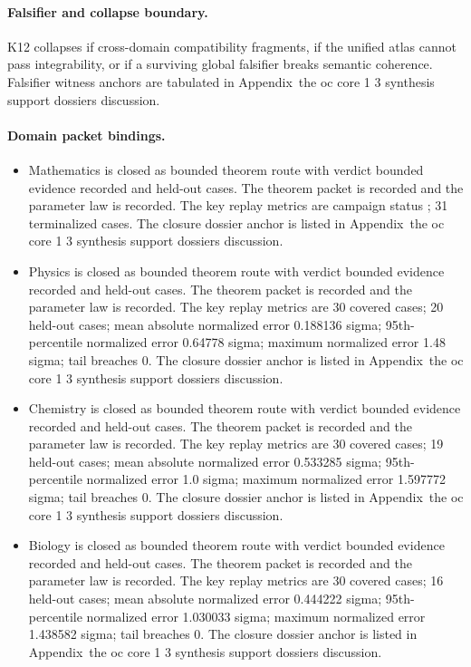 \paragraph{Falsifier and collapse boundary.}
K12 collapses if cross-domain compatibility fragments, if the unified atlas cannot pass integrability, or if a surviving global falsifier breaks semantic coherence.
Falsifier witness anchors are tabulated in Appendix~the oc core 1 3 synthesis support dossiers discussion.

\paragraph{Domain packet bindings.}
\begin{itemize}[leftmargin=1.6em,nosep]
\item Mathematics is closed as bounded theorem route with verdict bounded evidence recorded and  held-out cases. The theorem packet is recorded and the parameter law is recorded. The key replay metrics are campaign status ; 31 terminalized cases. The closure dossier anchor is listed in Appendix~the oc core 1 3 synthesis support dossiers discussion.
\item Physics is closed as bounded theorem route with verdict bounded evidence recorded and  held-out cases. The theorem packet is recorded and the parameter law is recorded. The key replay metrics are 30 covered cases; 20 held-out cases; mean absolute normalized error 0.188136 sigma; 95th-percentile normalized error 0.64778 sigma; maximum normalized error 1.48 sigma; tail breaches 0. The closure dossier anchor is listed in Appendix~the oc core 1 3 synthesis support dossiers discussion.
\item Chemistry is closed as bounded theorem route with verdict bounded evidence recorded and  held-out cases. The theorem packet is recorded and the parameter law is recorded. The key replay metrics are 30 covered cases; 19 held-out cases; mean absolute normalized error 0.533285 sigma; 95th-percentile normalized error 1.0 sigma; maximum normalized error 1.597772 sigma; tail breaches 0. The closure dossier anchor is listed in Appendix~the oc core 1 3 synthesis support dossiers discussion.
\item Biology is closed as bounded theorem route with verdict bounded evidence recorded and  held-out cases. The theorem packet is recorded and the parameter law is recorded. The key replay metrics are 30 covered cases; 16 held-out cases; mean absolute normalized error 0.444222 sigma; 95th-percentile normalized error 1.030033 sigma; maximum normalized error 1.438582 sigma; tail breaches 0. The closure dossier anchor is listed in Appendix~the oc core 1 3 synthesis support dossiers discussion.

\end{itemize}
